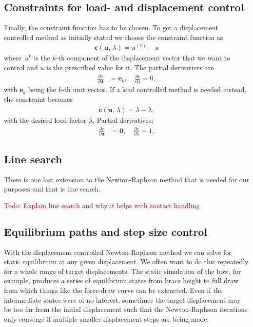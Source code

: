 \subsection{Constraints for load- and displacement control}

Finally, the constraint function has to be chosen.
To get a displacement controlled method as initially stated we choose the constraint function as
%
\begin{align}
\boldsymbol{c}(\boldsymbol{u},\,\lambda) = u^{(k)} - \overline{u}
\end{align}
%
where~$u^k$ is the $k$-th component of the displacement vector that we want to control and $\overline{u}$ is the prescribed value for it. The partial derivatives are
%
\begin{align*}
\frac{\partial c}{\partial \boldsymbol{u}} &= \boldsymbol{e}_k,\quad
\frac{\partial c}{\partial \lambda} = 0,
\end{align*}
%
with $\boldsymbol{e}_k$ being the $k$-th unit vector. If a load controlled method is needed instead, the constraint becomes
%
\begin{align}
\boldsymbol{c}(\boldsymbol{u},\,\lambda) = \lambda - \overline{\lambda},
\end{align}
%
with the desired load factor $\overline{\lambda}$. Partial derivatives:
%
\begin{align*}
\frac{\partial c}{\partial \boldsymbol{u}} &= \boldsymbol{0},\quad
\frac{\partial c}{\partial \lambda} = 1,
\end{align*}

\subsection{Line search}

There is one last extension to the Newton-Raphson method that is needed for our purposes and that is line search. 

\textcolor{red}{Todo: Explain line search and why it helps with contact handling}

\subsection{Equilibrium paths and step size control}

With the displacement controlled Newton-Raphson method we can solve for static equilibrium at any given displacement.
We often want to do this repeatedly for a whole range of target displacements.
The static simulation of the bow, for example, produces a series of equilibrium states from brace height to full draw from which things like the force-draw curve can be extracted.
Even if the intermediate states were of no interest, sometimes the target displacement may be too far from the initial displacement such that the Newton-Raphson iterations only converge if multiple smaller displacement steps are being made.

